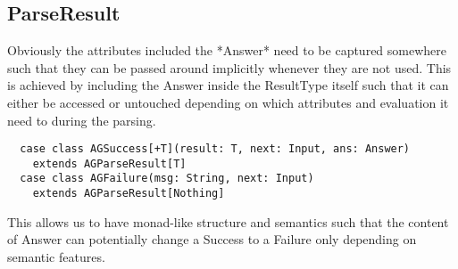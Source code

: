 \subsection{ParseResult}
Obviously the attributes included the *Answer* need to be captured somewhere such that they can be passed around implicitly whenever they are not used. This is achieved by including the Answer inside the ResultType itself such that it can either be accessed or untouched depending on which attributes and evaluation it need to during the parsing.

\begin{lstlisting}
  case class AGSuccess[+T](result: T, next: Input, ans: Answer)
    extends AGParseResult[T]
  case class AGFailure(msg: String, next: Input)
    extends AGParseResult[Nothing]
\end{lstlisting}

This allows us to have monad-like structure and semantics such that the content of Answer can potentially change a Success to a Failure only depending on semantic features.
